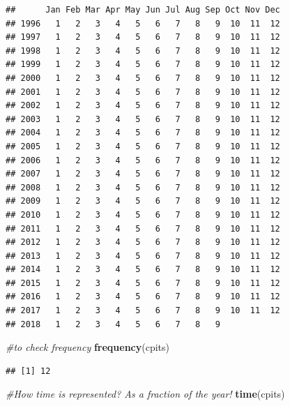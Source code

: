 \documentclass[]{book}
\newenvironment{Shaded}{\begin{snugshade}}{\end{snugshade}}
\newcommand{\CommentTok}[1]{\textcolor[rgb]{0.56,0.35,0.01}{\textit{#1}}}
\newcommand{\KeywordTok}[1]{\textcolor[rgb]{0.13,0.29,0.53}{\textbf{#1}}}
\newcommand{\NormalTok}[1]{#1}
\begin{document}
\begin{verbatim}
##      Jan Feb Mar Apr May Jun Jul Aug Sep Oct Nov Dec
## 1996   1   2   3   4   5   6   7   8   9  10  11  12
## 1997   1   2   3   4   5   6   7   8   9  10  11  12
## 1998   1   2   3   4   5   6   7   8   9  10  11  12
## 1999   1   2   3   4   5   6   7   8   9  10  11  12
## 2000   1   2   3   4   5   6   7   8   9  10  11  12
## 2001   1   2   3   4   5   6   7   8   9  10  11  12
## 2002   1   2   3   4   5   6   7   8   9  10  11  12
## 2003   1   2   3   4   5   6   7   8   9  10  11  12
## 2004   1   2   3   4   5   6   7   8   9  10  11  12
## 2005   1   2   3   4   5   6   7   8   9  10  11  12
## 2006   1   2   3   4   5   6   7   8   9  10  11  12
## 2007   1   2   3   4   5   6   7   8   9  10  11  12
## 2008   1   2   3   4   5   6   7   8   9  10  11  12
## 2009   1   2   3   4   5   6   7   8   9  10  11  12
## 2010   1   2   3   4   5   6   7   8   9  10  11  12
## 2011   1   2   3   4   5   6   7   8   9  10  11  12
## 2012   1   2   3   4   5   6   7   8   9  10  11  12
## 2013   1   2   3   4   5   6   7   8   9  10  11  12
## 2014   1   2   3   4   5   6   7   8   9  10  11  12
## 2015   1   2   3   4   5   6   7   8   9  10  11  12
## 2016   1   2   3   4   5   6   7   8   9  10  11  12
## 2017   1   2   3   4   5   6   7   8   9  10  11  12
## 2018   1   2   3   4   5   6   7   8   9
\end{verbatim}

\begin{Shaded}
\begin{Highlighting}[]
\CommentTok{#to check frequency}
\KeywordTok{frequency}\NormalTok{(cpits)}
\end{Highlighting}
\end{Shaded}

\begin{verbatim}
## [1] 12
\end{verbatim}

\begin{Shaded}
\begin{Highlighting}[]
\CommentTok{#How time is represented? As a fraction of the year!}
\KeywordTok{time}\NormalTok{(cpits)}
\end{Highlighting}
\end{Shaded}
\end{document}
